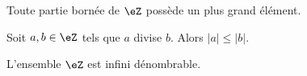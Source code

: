 \begin{lemma}       \label{LEMooMYEIooNFwNVI}
	Toute partie bornée de \( \eZ\) possède un plus grand élément.
\end{lemma}

\begin{proposition} \label{PROPooYJBMooZrzkNX}
	Soit \( a,b\in \eZ\) tels que \( a\) divise \( b\). Alors \( | a |\leq | b |\).
\end{proposition}

\begin{lemma}       \label{LEMooJNXIooBmdOVi}
	L'ensemble \( \eZ\) est infini dénombrable.
\end{lemma}
